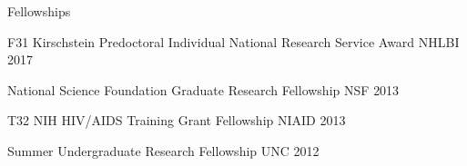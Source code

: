 


Fellowships 
\begin{cvhonors}

  \cvhonor
    {F31 Kirschstein Predoctoral Individual National Research Service Award} %
    {NHLBI}
    { } %
    {2017} %

  \cvhonor
    {National Science Foundation Graduate Research Fellowship} %
    {NSF}
    { } %
    {2013} %
    
  \cvhonor %
    {T32 NIH HIV/AIDS Training Grant Fellowship} %
    {NIAID}
    { } %
    {2013} %
    
  \cvhonor
    {Summer Undergraduate Research Fellowship} %
    {UNC} %
    { } %
    {2012} %
    
            
\end{cvhonors}


